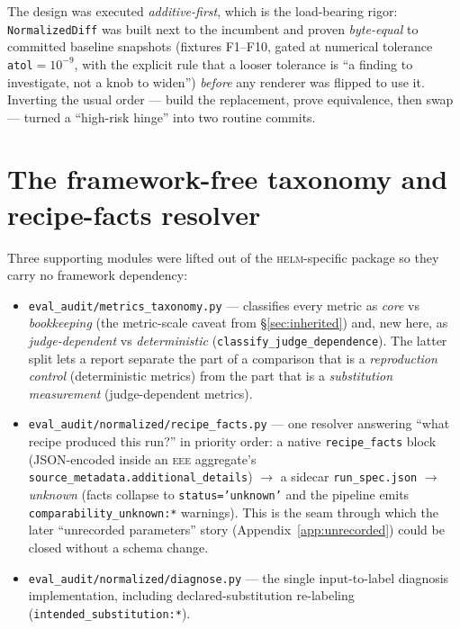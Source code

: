 \documentclass[11pt]{report}
\newcommand{\eeeshort}{\textsc{eee}\xspace}
\newcommand{\code}[1]{\texttt{#1}}
\newcommand{\file}[1]{\texttt{#1}}
\begin{document}
The design was executed \emph{additive-first}, which is the load-bearing rigor:
\code{NormalizedDiff} was built next to the incumbent and proven \emph{byte-equal}
to committed baseline snapshots (fixtures F1--F10, gated at numerical tolerance
\code{atol}$=10^{-9}$, with the explicit rule that a looser tolerance is ``a
finding to investigate, not a knob to widen'') \emph{before} any renderer was
flipped to use it. Inverting the usual order --- build the replacement, prove
equivalence, then swap --- turned a ``high-risk hinge'' into two routine commits.

\section{The framework-free taxonomy and recipe-facts resolver}
\label{sec:taxonomy}

Three supporting modules were lifted out of the \textsc{helm}-specific package so
they carry no framework dependency:

\begin{itemize}[nosep]
  \item \file{eval\_audit/metrics\_taxonomy.py} --- classifies every metric as
        \emph{core} vs \emph{bookkeeping} (the metric-scale caveat from
        \S\ref{sec:inherited}) and, new here, as \emph{judge-dependent} vs
        \emph{deterministic} (\code{classify\_judge\_dependence}). The latter
        split lets a report separate the part of a comparison that is a
        \emph{reproduction control} (deterministic metrics) from the part that is
        a \emph{substitution measurement} (judge-dependent metrics).
  \item \file{eval\_audit/normalized/recipe\_facts.py} --- one resolver answering
        ``what recipe produced this run?'' in priority order: a native
        \code{recipe\_facts} block (JSON-encoded inside an \eeeshort aggregate's
        \code{source\_metadata.additional\_details}) $\rightarrow$ a sidecar
        \file{run\_spec.json} $\rightarrow$ \emph{unknown} (facts collapse to
        \code{status='unknown'} and the pipeline emits
        \code{comparability\_unknown:*} warnings). This is the seam through which
        the later ``unrecorded parameters'' story (Appendix~\ref{app:unrecorded})
        could be closed without a schema change.
  \item \file{eval\_audit/normalized/diagnose.py} --- the single input-to-label
        diagnosis implementation, including declared-substitution re-labeling
        (\code{intended\_substitution:*}).
\end{itemize}
\end{document}
